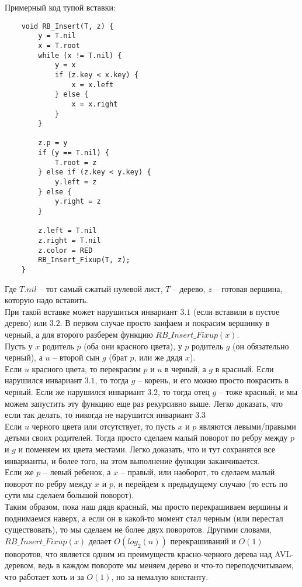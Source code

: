 Примерный код тупой вставки:

\begin{lstlisting}
    void RB_Insert(T, z) {
        y = T.nil
        x = T.root
        while (x != T.nil) {
            y = x
            if (z.key < x.key) {
                x = x.left
            } else {
                x = x.right
            }
        }

        z.p = y
        if (y == T.nil) {
            T.root = z
        } else if (z.key < y.key) {
            y.left = z
        } else {
            y.right = z
        }

        z.left = T.nil
        z.right = T.nil
        z.color = RED
        RB_Insert_Fixup(T, z);
    }
\end{lstlisting}

Где $T.nil$ -- тот самый сжатый нулевой лист, $T$ -- дерево, $z$ -- готовая вершина, которую надо вставить. \\
При такой вставке может нарушиться инвариант $3.1$ (если вставили в пустое дерево) или $3.2$. В первом случае просто заифаем и покрасим вершинку в черный, а для второго разберем функцию $RB\_Insert\_Fixup(x)$. \\

Пусть у $x$ родитель $p$ (оба они красного цвета), у $p$ родитель $g$ (он обязательно черный), а $u$ -- второй сын $g$ (брат $p$, или же дядя $x$). \\
Если $u$ красного цвета, то перекрасим $p$ и $u$ в черный, а $g$ в красный. Если нарушился инвариант $3.1$, то тогда $g$ -- корень, и его можно просто покрасить в черный. Если же нарушился инвариант $3.2$, то тогда отец $g$ -- тоже красный, и мы можем запустить эту функцию еще раз рекурсивно выше. Легко доказать, что если так делать, то никогда не нарушится инвариант $3.3$ \\ 
Если $u$ черного цвета или отсутствует, то пусть $x$ и $p$ являются левыми/правыми детьми своих родителей. Тогда просто сделаем малый поворот по ребру между $p$ и $g$ и поменяем их цвета местами. Легко доказать, что и тут сохранятся все инварианты, и более того, на этом выполнение функции заканчивается. \\
Если же $p$ -- левый ребенок, а $x$ -- правый, или наоборот, то сделаем малый поворот по ребру между $x$ и $p$, и перейдем к предыдущему случаю (то есть по сути мы сделаем большой поворот). \\
Таким образом, пока наш дядя красный, мы просто перекрашиваем вершины и поднимаемся наверх, а если он в какой-то момент стал черным (или перестал существовать), то мы сделаем не более двух поворотов. Другими словами, $RB\_Insert\_Fixup(x)$ делает $O(log_2(n))$ перекрашиваний и $O(1)$ поворотов, что является одним из преимуществ красно-черного дерева над AVL-деревом, ведь в каждом повороте мы меняем дерево и что-то переподсчитываем, что работает хоть и за $O(1)$, но за немалую константу.

